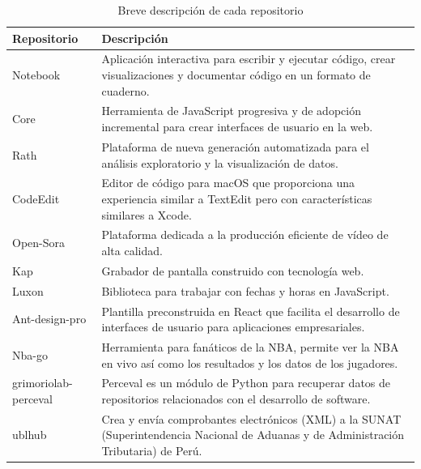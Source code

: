 \documentclass[a4paper, 12pt]{book}
\begin{document}
\begin{table}
  \begin{center}
   \begin{tabular}{ | l | p{12cm} |} %
     \hline
     \textbf{Repositorio}    & \textbf{Descripción}                                                                                                                  \\ \hline %
     Notebook               & Aplicación interactiva para escribir y ejecutar código, crear visualizaciones y documentar código en un formato de cuaderno.           \\ \hline
     Core                   & Herramienta de JavaScript progresiva y de adopción incremental para crear interfaces de usuario en la web.                             \\ \hline
     Rath                   & Plataforma de nueva generación automatizada para el análisis exploratorio y la visualización de datos.                                 \\ \hline
     CodeEdit               & Editor de código para macOS que proporciona una experiencia similar a TextEdit pero con características similares a Xcode.             \\ \hline
     Open-Sora              & Plataforma dedicada a la producción eficiente de vídeo de alta calidad.                                                                \\ \hline
     Kap                    & Grabador de pantalla construido con tecnología web.                                                                                    \\ \hline
     Luxon                  & Biblioteca para trabajar con fechas y horas en JavaScript.                                                                             \\ \hline
     Ant-design-pro         & Plantilla preconstruida en React que facilita el desarrollo de interfaces de usuario para aplicaciones empresariales.                  \\ \hline
     Nba-go                 & Herramienta para fanáticos de la NBA, permite ver la NBA en vivo así como los resultados y los datos de los jugadores.                 \\ \hline
     grimoriolab-perceval   & Perceval es un módulo de Python para recuperar datos de repositorios relacionados con el desarrollo de software.                       \\ \hline
     ublhub                 & Crea y envía comprobantes electrónicos (XML) a la SUNAT (Superintendencia Nacional de Aduanas y de Administración Tributaria) de Perú. \\ 
     \hline
   \end{tabular}
   \caption{Breve descripción de cada repositorio}
   \label{tab:repositorios-descripción}
  \end{center}
 \end{table}
\end{document}

